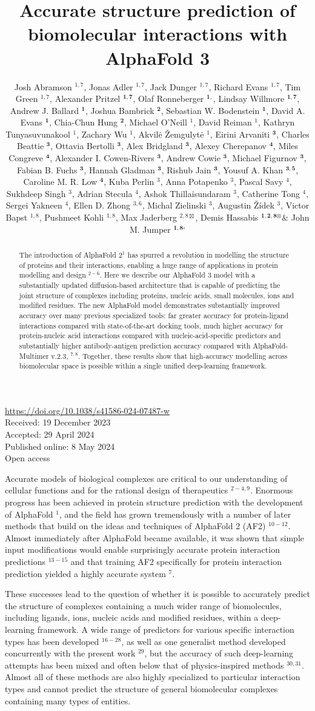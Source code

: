 \documentclass[10pt]{article}
\title{Accurate structure prediction of biomolecular interactions with AlphaFold 3 }
\author{Josh Abramson ${ }^{1,7}$, Jonas Adler ${ }^{1,7}$, Jack Dunger ${ }^{1,7}$, Richard Evans ${ }^{1,7}$, Tim Green ${ }^{1,7}$, Alexander Pritzel ${ }^{\mathbf{1} \boldsymbol{,} \mathbf{7}}$, Olaf Ronneberger ${ }^{\mathbf{1} \boldsymbol{,}}$, Lindsay Willmore ${ }^{\mathbf{1} \boldsymbol{,} \mathbf{7}}$, Andrew J. Ballard ${ }^{\mathbf{1}}$, Joshua Bambrick ${ }^{\mathbf{2}}$, Sebastian W. Bodenstein ${ }^{\mathbf{1}}$, David A. Evans ${ }^{\mathbf{1}}$, Chia-Chun Hung ${ }^{\mathbf{2}}$, Michael O'Neill ${ }^{1}$, David Reiman ${ }^{1}$, Kathryn Tunyasuvunakool ${ }^{1}$, Zachary Wu ${ }^{1}$, Akvilė Žemgulytė ${ }^{1}$, Eirini Arvaniti ${ }^{\mathbf{3}}$, Charles Beattie ${ }^{\mathbf{3}}$, Ottavia Bertolli ${ }^{\mathbf{3}}$, Alex Bridgland ${ }^{\mathbf{3}}$, Alexey Cherepanov ${ }^{\mathbf{4}}$, Miles Congreve ${ }^{\mathbf{4}}$, Alexander I. Cowen-Rivers ${ }^{\mathbf{3}}$, Andrew Cowie ${ }^{\mathbf{3}}$, Michael Figurnov ${ }^{\mathbf{3}}$, Fabian B. Fuchs ${ }^{\mathbf{3}}$, Hannah Gladman ${ }^{\mathbf{3}}$, Rishub Jain ${ }^{\mathbf{3}}$, Yousuf A. Khan ${ }^{\mathbf{3}, \mathbf{5}}$, Caroline M. R. Low ${ }^{\mathbf{4}}$, Kuba Perlin ${ }^{3}$, Anna Potapenko ${ }^{3}$, Pascal Savy ${ }^{4}$, Sukhdeep Singh ${ }^{3}$, Adrian Stecula ${ }^{4}$, Ashok Thillaisundaram ${ }^{3}$, Catherine Tong ${ }^{4}$, Sergei Yakneen ${ }^{4}$, Ellen D. Zhong ${ }^{3,6}$, Michal Zielinski ${ }^{3}$, Augustin Žídek ${ }^{3}$, Victor Bapst ${ }^{1,8}$, Pushmeet Kohli ${ }^{1,8}$, Max Jaderberg ${ }^{2,8 \boxtimes}$, Demis Hassabis ${ }^{\mathbf{1} \boldsymbol{,} \boldsymbol{2} \boldsymbol{,} \boldsymbol{8} \boldsymbol{\otimes}} \boldsymbol{\&}$ John M. Jumper ${ }^{\mathbf{1} \boldsymbol{,} \boldsymbol{8} \boldsymbol{\square}}$}
\date{}
\begin{document}
\maketitle
\captionsetup{singlelinecheck=false}
\href{https://doi.org/10.1038/s41586-024-07487-w}{https://doi.org/10.1038/s41586-024-07487-w}\\
Received: 19 December 2023\\
Accepted: 29 April 2024\\
Published online: 8 May 2024\\
Open access



\begin{abstract}
The introduction of AlphaFold $2^{1}$ has spurred a revolution in modelling the structure of proteins and their interactions, enabling a huge range of applications in protein modelling and design ${ }^{2-6}$. Here we describe our AlphaFold 3 model with a substantially updated diffusion-based architecture that is capable of predicting the joint structure of complexes including proteins, nucleic acids, small molecules, ions and modified residues. The new AlphaFold model demonstrates substantially improved accuracy over many previous specialized tools: far greater accuracy for protein-ligand interactions compared with state-of-the-art docking tools, much higher accuracy for protein-nucleic acid interactions compared with nucleic-acid-specific predictors and substantially higher antibody-antigen prediction accuracy compared with AlphaFold-Multimer v.2.3, ${ }^{7,8}$. Together, these results show that high-accuracy modelling across biomolecular space is possible within a single unified deep-learning framework.
\end{abstract}

Accurate models of biological complexes are critical to our understanding of cellular functions and for the rational design of therapeutics ${ }^{2-4,9}$. Enormous progress has been achieved in protein structure prediction with the development of AlphaFold ${ }^{1}$, and the field has grown tremendously with a number of later methods that build on the ideas and techniques of AlphaFold 2 (AF2) ${ }^{10-12}$. Almost immediately after AlphaFold became available, it was shown that simple input modifications would enable surprisingly accurate protein interaction predictions ${ }^{13-15}$ and that training AF2 specifically for protein interaction prediction yielded a highly accurate system ${ }^{7}$.

These successes lead to the question of whether it is possible to accurately predict the structure of complexes containing a much wider range of biomolecules, including ligands, ions, nucleic acids and modified residues, within a deep-learning framework. A wide range of predictors for various specific interaction types has been developed ${ }^{16-28}$, as well as one generalist method developed concurrently with the present work ${ }^{29}$, but the accuracy of such deep-learning attempts has been mixed and often below that of physics-inspired methods ${ }^{30,31}$. Almost all of these methods are also highly specialized to particular interaction types and cannot predict the structure of general biomolecular complexes containing many types of entities.
\end{document}
